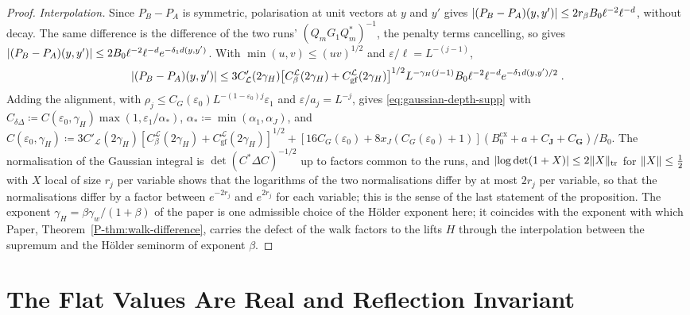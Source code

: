 \documentclass[11pt]{preprint}
\DeclarePairedDelimiter{\abs}{\lvert}{\rvert}
\DeclarePairedDelimiter{\norm}{\lVert}{\rVert}
\numberwithin{equation}{section}
\theoremstyle{definition}
\theoremstyle{remark}
\theoremstyle{plain}
\begin{document}
\begin{proof}
\emph{Interpolation.} Since $P_B - P_A$ is symmetric, polarisation at unit vectors at $y$ and $y'$ gives $\abs{(P_B - P_A)(y, y')} \leq 2r_\beta B_0\ell^{-2}\ell^{-d}$, without decay. The same difference is the difference of the two runs' $(Q_mG_1Q_m^*)^{-1}$, the penalty terms cancelling, so \cite[(3.132)]{BalabanPBG} gives $\abs{(P_B - P_A)(y, y')} \leq 2B_0\ell^{-2}\ell^{-d}e^{-\delta_1d(y,y')}$. With $\min(u, v) \leq (uv)^{1/2}$ and $\varepsilon/\ell = L^{-(j-1)}$,
\begin{equation}\label{eq:penalty-interpolated}
    \abs{(P_B - P_A)(y, y')} \leq 3C'_{\mathcal L}(2\gamma_H)\bigl[C^{\mathcal L}_\beta(2\gamma_H) + C^{\mathcal L}_{\mathrm{gf}}(2\gamma_H)\bigr]^{1/2}L^{-\gamma_H(j-1)}B_0\ell^{-2}\ell^{-d}e^{-\delta_1d(y,y')/2}\;.
\end{equation}
Adding the alignment, with $\rho_j \leq C_G(\varepsilon_0)L^{-(1-\varepsilon_0)j}\varepsilon_1$ and $\varepsilon/a_j = L^{-j}$, gives \eqref{eq:gaussian-depth-supp} with $C_{\delta\Delta} \coloneqq C(\varepsilon_0, \gamma_H)\max(1, \varepsilon_1/\alpha_*)$, $\alpha_* \coloneqq \min(\alpha_1, \alpha_J)$, and $C(\varepsilon_0, \gamma_H) \coloneqq 3C'_{\mathcal L}(2\gamma_H)[C^{\mathcal L}_\beta(2\gamma_H) + C^{\mathcal L}_{\mathrm{gf}}(2\gamma_H)]^{1/2} + [16C_G(\varepsilon_0) + 8x_J(C_G(\varepsilon_0) + 1)](B^{\mathrm{cx}}_0 + a + C_{\mathbf J} + C_{\mathbf G})/B_0$. The normalisation of the Gaussian integral is $\det(C^*\Delta C)^{-1/2}$ up to factors common to the runs, and $\abs{\log\det(1 + X)} \leq 2\norm X_{\mathrm{tr}}$ for $\norm X \leq \frac12$ with $X$ local of size $r_j$ per variable shows that the logarithms of the two normalisations differ by at most $2r_j$ per variable, so that the normalisations differ by a factor between $e^{-2r_j}$ and $e^{2r_j}$ for each variable; this is the sense of the last statement of the proposition. The exponent $\gamma_H = \beta\gamma_w/(1 + \beta)$ of the paper is one admissible choice of the H\"older exponent here; it coincides with the exponent with which Paper, Theorem~\ref{P-thm:walk-difference}, carries the defect of the walk factors to the lifts $H$ through the interpolation between the supremum and the H\"older seminorm of exponent $\beta$.
\end{proof}

\section{The Flat Values Are Real and Reflection Invariant}\label{sec:flat-values}
\end{document}
